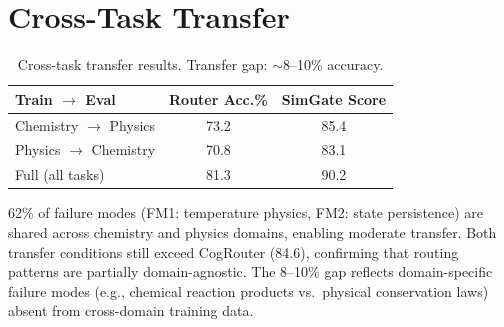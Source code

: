 \documentclass[11pt,a4paper]{article}
\begin{document}
\section{Cross-Task Transfer}
\label{app:transfer}

\begin{table}[h]
\centering
\small
\begin{tabular}{lcc}
\toprule
\textbf{Train $\to$ Eval} & \textbf{Router Acc.\%} & \textbf{SimGate Score} \\
\midrule
Chemistry $\to$ Physics & 73.2 & 85.4 \\
Physics $\to$ Chemistry & 70.8 & 83.1 \\
Full (all tasks) & 81.3 & 90.2 \\
\bottomrule
\end{tabular}
\caption{Cross-task transfer results. Transfer gap: $\sim$8--10\% accuracy.}
\label{tab:transfer}
\end{table}

62\% of failure modes (FM1: temperature physics, FM2: state persistence) are shared across chemistry and physics domains, enabling moderate transfer.
Both transfer conditions still exceed CogRouter (84.6), confirming that routing patterns are partially domain-agnostic.
The 8--10\% gap reflects domain-specific failure modes (e.g., chemical reaction products vs.\ physical conservation laws) absent from cross-domain training data.
\end{document}
